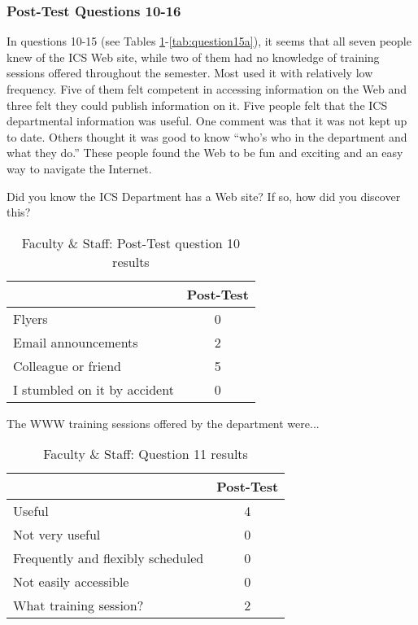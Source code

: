 \subsubsection{Post-Test Questions 10-16}

In questions 10-15 (see Tables
\ref{tab:Postquestion10a}-\ref{tab:question15a}), it seems that all seven
people knew of the ICS Web site, while two of them had no knowledge of training
sessions offered throughout the semester.  Most used it with relatively low
frequency.  Five of them felt competent in accessing information on the Web and
three felt they could publish information on it.  Five people felt that the ICS
departmental information was useful.  One comment was that it was not kept up
to date.  Others thought it was good to know ``who's who in the department and
what they do.''  These people found the Web to be fun and exciting and an easy
way to navigate the Internet.

\begin{table}[htbp]
\caption{Faculty \& Staff: Post-Test question 10 results}
{Did you know the ICS Department has a Web site? If so, how did you
  discover this?}
\begin{center}
\begin{tabular}{|l|c|} \hline
  & {\bf Post-Test} \\ \hline 
 {Flyers} & 0 \\ \hline 
 {Email announcements} & 2 \\ \hline 
 {Colleague or friend} & 5 \\ \hline 
 {I stumbled on it by accident} & 0 \\ \hline 
\end{tabular}
\end{center}
\label{tab:Postquestion10a}
\end{table}

\begin{table}[htbp]
\caption{Faculty \& Staff: Question 11 results}
{The WWW training sessions offered by the department were...}
\begin{center}
\begin{tabular}{|l|c|} \hline
  & {\bf Post-Test} \\ \hline 
 {Useful} & 4 \\ \hline 
 {Not very useful} & 0 \\ \hline 
 {Frequently and flexibly scheduled} & 0 \\ \hline 
 {Not easily accessible} & 0 \\ \hline 
 {What training session?} & 2 \\ \hline 
\end{tabular}
\end{center}
\label{tab:question11a}
\end{table}

